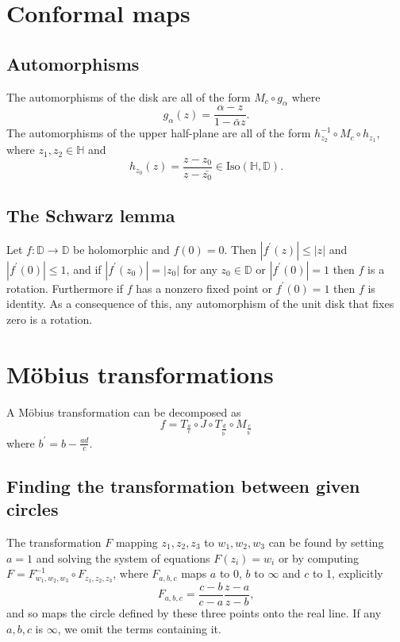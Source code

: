 \documentclass{article}
\begin{document}
\section{Conformal maps}

\subsection{Automorphisms}
The automorphisms of the disk are all of the form $M_c \circ g_\alpha$ where
$$
  g_\alpha(z)
= \frac{\alpha - z}
       {1 - \bar{\alpha} z}.
$$
The automorphisms of the upper half-plane are all of the form
$h_{z_2}^{-1} \circ M_c \circ h_{z_1}$, where $z_1, z_2 \in
\mathbb{H}$ and
$$
  h_{z_0}(z)
= \frac{z - z_0}
       {z - \bar{z_0}}
\in \mathrm{Iso}(\mathbb{H}, \mathbb{D}).
$$

\subsection{The Schwarz lemma}
Let $f : \mathbb{D} \to \mathbb{D}$ be holomorphic and $f(0) =
0$. Then $|f^\prime(z)| \leq |z|$ and $|f^\prime(0)| \leq 1$, and if
$|f^\prime(z_0)| = |z_0|$ for any $z_0 \in \mathbb{D}$ or
$|f^\prime(0)| = 1$ then $f$ is a rotation. Furthermore if
$f$ has a nonzero fixed point or $f^\prime(0) = 1$
then $f$ is identity. As a consequence of this, any automorphism of
the unit disk that fixes zero is a rotation.

\section{M\"obius transformations}
A M\"obius transformation can be decomposed as
$$
f = T_{\frac{a}{c}} \circ J \circ T_{\frac{d}{b^\prime}} \circ M_{\frac{c}{b^\prime}}
$$
where $b^\prime = b - \frac{ad}{c}$.

\subsection{Finding the transformation between given circles}
The transformation $F$ mapping $z_1, z_2, z_3$ to $w_1, w_2, w_3$ can be
found by setting $a = 1$ and solving the system of equations $F(z_i) =
w_i$ or by computing
$F = F_{w_1, w_2, w_3}^{-1} \circ F_{z_1, z_2, z_3}$,
where $F_{a, b, c}$ maps $a$ to $0$, $b$ to $\infty$ and $c$ to 1,
explicitly
$$
  F_{a, b, c}
= \frac{c - b}
       {c - a}
  \frac{z - a}
       {z - b},
$$
and so maps the circle defined by these three points onto the real
line. If any $a, b, c$ is $\infty$, we omit the terms containing it.
\end{document}
